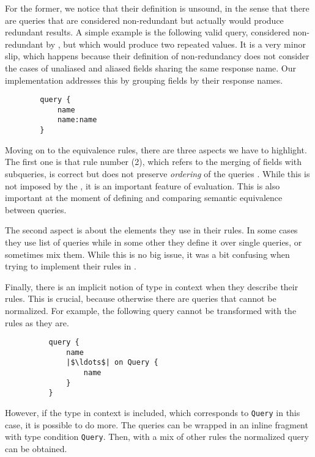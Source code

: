 For the former, we notice that their definition is unsound, in the sense that there are queries that are considered non-redundant but actually would produce redundant results. A simple example is the following valid query, considered non-redundant by \HP, but which would produce two repeated values. It is a very minor slip, which happens because their definition of non-redundancy does not consider the cases of unaliased and aliased fields sharing the same response name. Our implementation addresses this by grouping fields by their response names.

\begin{verbatim}
        query {
            name
            name:name
        }
\end{verbatim}

Moving on to the equivalence rules, there are three aspects we have to highlight. The first one is that rule number (2), which refers to the merging of fields with subqueries, is correct but does not preserve {\em ordering} of the queries . While this is not imposed by the \spec, it is an important feature of \gql evaluation. This is also important at the moment of defining and comparing semantic equivalence between queries.

The second aspect is about the elements they use  in their rules. In some cases they use list of queries while in some other they define it over single queries, or sometimes mix them. While this is no big issue, it was a bit confusing when trying to implement their rules in \coq.

Finally, there is an implicit notion of type in context when they describe their rules. This is crucial, because otherwise there are queries that cannot be normalized. For example, the following query cannot be transformed with the rules as they are.
\begin{verbatim}
          query {
              name
              |$\ldots$| on Query {
                  name
              }
          }
\end{verbatim}
However, if the type in context is included, which corresponds to \texttt{Query} in this case, it is possible to do more. The queries can be wrapped in an inline fragment with type condition \texttt{Query}. Then, with a mix of other rules the normalized query can be obtained.


